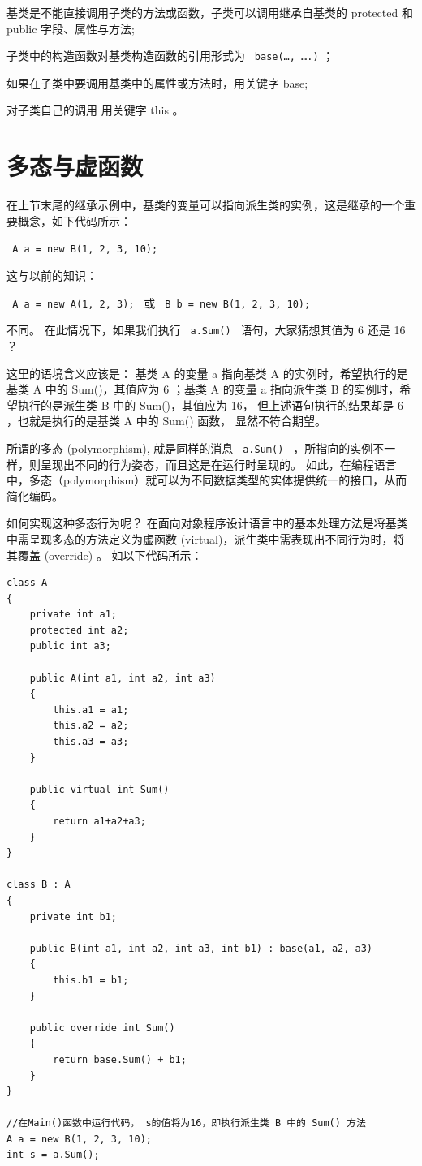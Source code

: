  基类是不能直接调用子类的方法或函数，子类可以调用继承自基类的 protected 和 public 字段、属性与方法;
 
 子类中的构造函数对基类构造函数的引用形式为 \verb| base(…, ….)| ；
 
 如果在子类中要调用基类中的属性或方法时，用关键字 base;
 
 对子类自己的调用 用关键字 this 。
 



\section{多态与虚函数}

在上节末尾的继承示例中，基类的变量可以指向派生类的实例，这是继承的一个重要概念，如下代码所示：

\verb| A a = new B(1, 2, 3, 10); |

这与以前的知识： 

\verb| A a = new A(1, 2, 3); | 或 \verb| B b = new B(1, 2, 3, 10); |

不同。 在此情况下，如果我们执行 \verb| a.Sum() | 语句，大家猜想其值为 6 还是 16 ？

这里的语境含义应该是： 基类 A 的变量 a 指向基类 A 的实例时，希望执行的是基类 A 中的 Sum()，其值应为 6 ；基类 A 的变量 a 指向派生类 B 的实例时，希望执行的是派生类 B 中的 Sum()，其值应为 16， 但上述语句执行的结果却是 6 ，也就是执行的是基类 A 中的 Sum() 函数， 显然不符合期望。

所谓的多态 (polymorphism), 就是同样的消息 \verb| a.Sum() | ，所指向的实例不一样，则呈现出不同的行为姿态，而且这是在运行时呈现的。 如此，在编程语言中，多态（polymorphism）就可以为不同数据类型的实体提供统一的接口，从而简化编码。


如何实现这种多态行为呢？ 在面向对象程序设计语言中的基本处理方法是将基类中需呈现多态的方法定义为虚函数 (virtual)，派生类中需表现出不同行为时，将其覆盖 (override) 。 如以下代码所示：

\begin{lstlisting}
class A 
{
	private int a1;
	protected int a2;
	public int a3;	
	
	public A(int a1, int a2, int a3)
	{
		this.a1 = a1;
		this.a2 = a2;
		this.a3 = a3;
	}
	
	public virtual int Sum()
	{
		return a1+a2+a3;
	}
}

class B : A
{
	private int b1;
	
	public B(int a1, int a2, int a3, int b1) : base(a1, a2, a3)
	{
		this.b1 = b1;
	}
	
	public override int Sum()
	{
		return base.Sum() + b1; 
	}
}

//在Main()函数中运行代码， s的值将为16，即执行派生类 B 中的 Sum() 方法
A a = new B(1, 2, 3, 10);
int s = a.Sum();
\end{lstlisting}

